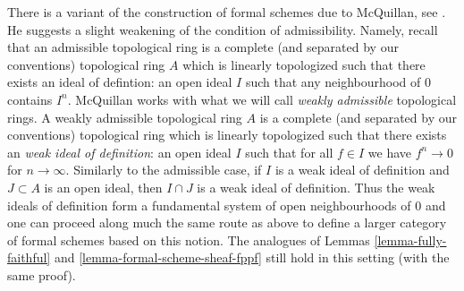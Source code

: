 \begin{remark}
\label{remark-mcquillan}
There is a variant of the construction of formal schemes due to
McQuillan, see \cite{McQuillan}.
He suggests a slight weakening of the condition of admissibility.
Namely, recall that an admissible topological ring is a complete
(and separated by our conventions) topological ring $A$
which is linearly topologized such that there exists an
ideal of defintion: an
open ideal $I$ such that any neighbourhood of $0$ contains $I^n$.
McQuillan works with what we will call {\it weakly admissible}
topological rings. A weakly admissible topological ring $A$ is a
complete (and separated by our conventions) topological ring
which is linearly topologized such that there exists an
{\it weak ideal of definition}: an open ideal $I$ such that
for all $f \in I$ we have
$f^n \to 0$ for $n \to \infty$. Similarly to the admissible case,
if $I$ is a weak ideal of definition and $J \subset A$ is an
open ideal, then $I \cap J$ is a weak ideal of definition.
Thus the weak ideals of definition form a fundamental system of
open neighbourhoods of $0$ and
one can proceed along much the same route as above
to define a larger category of formal schemes based
on this notion. The analogues of Lemmas \ref{lemma-fully-faithful} and
\ref{lemma-formal-scheme-sheaf-fppf}
still hold in this setting (with the same proof).
\end{remark}

